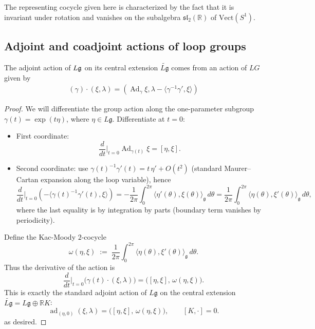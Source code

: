 \documentclass[12pt]{article}
\begin{document}
The representing cocycle given here is characterized by the fact that it is invariant under rotation and vanishes on the subalgebra $\mathfrak{sl}_2(\mathbb{R})$ of
$\mathrm{Vect}(S^1)$.

\subsection{Adjoint and coadjoint actions of loop groups}
\begin{proposition}
    The adjoint action of $L\mathfrak{g}$ on its central extension $\widetilde{L\mathfrak{g}}$ comes from an action of $LG$ given by \begin{align*}
        (\gamma)\cdot(\xi,\lambda) = (\operatorname{Ad}_\gamma \xi, \lambda - \langle \gamma^{-1}\gamma', \xi \rangle)
    \end{align*}
\end{proposition}

\begin{proof}
    We will differentiate the group action along the one-parameter subgroup $\gamma(t) = \exp(t\eta)$, where $\eta \in L\mathfrak{g}$. Differentiate at $t=0$:
    \begin{itemize}
        \item First coordinate:
              \[
                  \frac{d}{dt}\Big|_{t=0}\operatorname{Ad}_{\gamma(t)}\xi
                  = [\eta,\xi].
              \]
        \item Second coordinate: use $\gamma(t)^{-1}\gamma'(t)=t\,\eta'+O(t^2)$ (standard Maurer–Cartan expansion along the loop variable), hence
              \[
                  \frac{d}{dt}\Big|_{t=0}\!\left(-\big\langle\gamma(t)^{-1}\gamma'(t),\xi\big\rangle\right)
                  = -\frac{1}{2\pi}\int_0^{2\pi}\!\langle \eta'(\theta),\xi(\theta)\rangle_{\mathfrak g}\,d\theta
                  = \frac{1}{2\pi}\int_0^{2\pi}\!\langle \eta(\theta),\xi'(\theta)\rangle_{\mathfrak g}\,d\theta,
              \]
              where the last equality is by integration by parts (boundary term vanishes by periodicity).
    \end{itemize}

    Define the Kac-Moody $2$-cocycle
    \[
        \omega(\eta,\xi)\;:=\;\frac{1}{2\pi}\int_0^{2\pi}\!\langle \eta(\theta),\xi'(\theta)\rangle_{\mathfrak g}\,d\theta.
    \]
    Thus the derivative of the action is
    \[
        \frac{d}{dt}\Big|_{t=0}\big(\gamma(t)\cdot(\xi,\lambda)\big)
        = \big([\eta,\xi],\,\omega(\eta,\xi)\big).
    \]
    This is exactly the standard adjoint action of $L\mathfrak g$ on the central extension $\widetilde{L\mathfrak g}=L\mathfrak g\oplus\mathbb R K$:
    \[
        \operatorname{ad}_{(\eta,0)}(\xi,\lambda)=\big([\eta,\xi],\,\omega(\eta,\xi)\big),\qquad [K,\cdot]=0.
    \] as desired.
\end{proof}
\end{document}

